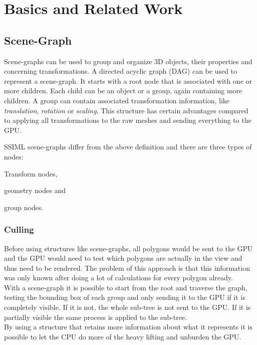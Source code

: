 
\section{Basics and Related Work}
\label{basics-and-related-work}

\subsection{Scene-Graph}\label{scene-graph}

Scene-graphs can be used to group and organize 3D objects, their
properties and concerning transformations. A directed acyclic graph
(DAG) can be used to represent a scene-graph. It starts with a root node
that is associated with one or more children. Each child can be an
object or a group, again containing more children. A group can contain
associated transformation information, like \emph{translation},
\emph{rotation} or \emph{scaling}. This structure has certain advantages
compared to applying all transformations to the raw meshes and sending
everything to the \gls{GPU}. \cite{realityprime}

\gls{SSIML} \cite{Lenk:2012:MID:2338714.2338742} scene-graphs differ from the
above definition and there are three types of nodes:

\begin{itemize*}
  \item Transform nodes,
  \item geometry nodes and
  \item group nodes.
\end{itemize*}

\subsubsection{Culling}\label{culling}

Before using structures like scene-graphs, all polygons would be sent to
the \gls{GPU} and the \gls{GPU} would need to test which polygons are actually in the
view and thus need to be rendered. The problem of this approach is
that this information was only known after doing a lot of calculations
for every polygon already.\\
With a scene-graph it is possible to start from the root and traverse the
graph, testing the bounding box of each group and only sending it to the
\gls{GPU} if it is completely visible. If it is not, the whole sub-tree is not
sent to the \gls{GPU}. If it is partially visible the same process is applied
to the sub-tree.\\
By using a structure that retains more information about what it
represents it is possible to let the CPU do more of the heavy
lifting and unburden the \gls{GPU}.

